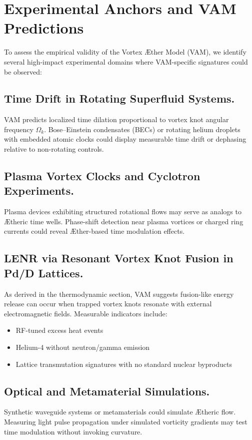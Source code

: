 \section{Experimental Anchors and VAM Predictions}


To assess the empirical validity of the Vortex Æther Model (VAM), we identify several high-impact experimental domains where VAM-specific signatures could be observed:

\subsection{Time Drift in Rotating Superfluid Systems.} VAM predicts localized time dilation proportional to vortex knot angular frequency
$\Omega_k$. Bose–Einstein condensates (BECs) or rotating helium droplets with embedded atomic clocks could display measurable time drift or dephasing relative to non-rotating controls.

\subsection{Plasma Vortex Clocks and Cyclotron Experiments.} Plasma devices exhibiting structured rotational flows may serve as analogs to Ætheric time wells. Phase-shift detection near plasma vortices or charged ring currents could reveal Æther-based time modulation effects.

\subsection{LENR via Resonant Vortex Knot Fusion in Pd/D Lattices.} As derived in the thermodynamic section, VAM suggests fusion-like energy release can occur when trapped vortex knots resonate with external electromagnetic fields. Measurable indicators include:
\begin{itemize}
    \item RF-tuned excess heat events
    \item Helium-4 without neutron/gamma emission
    \item Lattice transmutation signatures with no standard nuclear byproducts
\end{itemize}

\subsection{Optical and Metamaterial Simulations.} Synthetic waveguide systems or metamaterials could simulate Ætheric flow. Measuring light pulse propagation under simulated vorticity gradients may test time modulation without invoking curvature.


